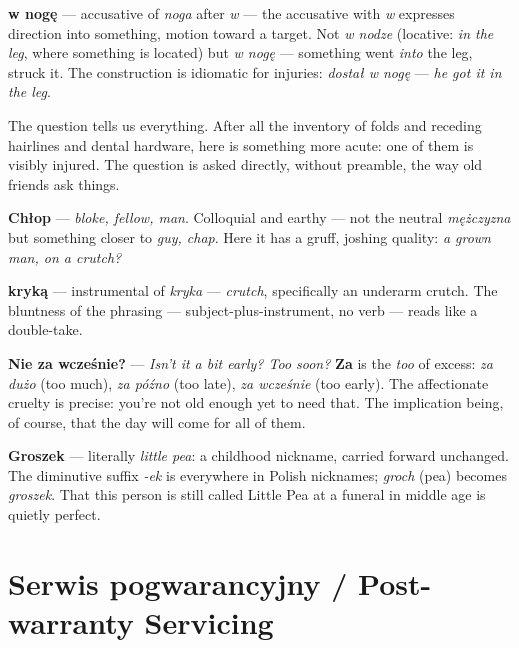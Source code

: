 \textbf{w nogę} --- accusative of \textit{noga} after \textit{w} ---
the accusative with \textit{w} expresses direction into something,
motion toward a target. Not \textit{w nodze} (locative: \textit{in the
leg}, where something is located) but \textit{w nogę} --- something
went \textit{into} the leg, struck it. The construction is idiomatic
for injuries: \textit{dostał w nogę} --- \textit{he got it in the leg}.

The question tells us everything. After all the inventory of folds and
receding hairlines and dental hardware, here is something more acute:
one of them is visibly injured. The question is asked directly, without
preamble, the way old friends ask things.



\textbf{Chłop} --- \textit{bloke, fellow, man}. Colloquial and earthy
--- not the neutral \textit{mężczyzna} but something closer to
\textit{guy, chap}. Here it has a gruff, joshing quality: \textit{a
grown man, on a crutch?}

\textbf{kryką} --- instrumental of \textit{kryka} --- \textit{crutch},
specifically an underarm crutch. The bluntness of the phrasing ---
subject-plus-instrument, no verb --- reads like a double-take.

\textbf{Nie za wcześnie?} --- \textit{Isn't it a bit early? Too soon?}
\textbf{Za} is the \textit{too} of excess: \textit{za dużo} (too
much), \textit{za późno} (too late), \textit{za wcześnie} (too early).
The affectionate cruelty is precise: you're not old enough yet to need
that. The implication being, of course, that the day will come for all
of them.

\textbf{Groszek} --- literally \textit{little pea}: a childhood
nickname, carried forward unchanged. The diminutive suffix
\textit{-ek} is everywhere in Polish nicknames; \textit{groch} (pea)
becomes \textit{groszek}. That this person is still called Little Pea
at a funeral in middle age is quietly perfect.

\section{Serwis pogwarancyjny / Post-warranty Servicing}

